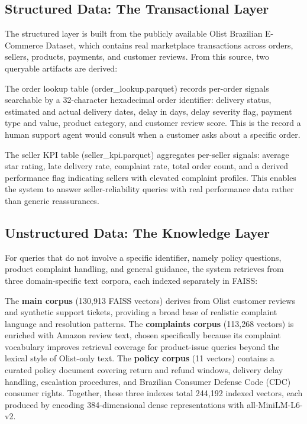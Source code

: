 \documentclass[conference]{IEEEtran}
\begin{document}
\subsection{Structured Data: The Transactional Layer}
The structured layer is built from the publicly available Olist Brazilian
E-Commerce Dataset, which contains real marketplace transactions across orders,
sellers, products, payments, and customer reviews. From this source, two queryable
artifacts are derived:

The order lookup table (order\_lookup.parquet) records per-order signals searchable
by a 32-character hexadecimal order identifier: delivery status, estimated and
actual delivery dates, delay in days, delay severity flag, payment type and value,
product category, and customer review score. This is the record a human support
agent would consult when a customer asks about a specific order.

The seller KPI table (seller\_kpi.parquet) aggregates per-seller signals: average
star rating, late delivery rate, complaint rate, total order count, and a derived
performance flag indicating sellers with elevated complaint profiles.
This enables the system to answer seller-reliability queries with real performance
data rather than generic reassurances.

\subsection{Unstructured Data: The Knowledge Layer}
For queries that do not involve a specific identifier, namely policy questions,
product complaint handling, and general guidance, the system retrieves from three
domain-specific text corpora, each indexed separately in FAISS:

The \textbf{main corpus} (130,913 FAISS vectors) derives from Olist customer
reviews and synthetic support tickets, providing a broad base of realistic
complaint language and resolution patterns. The \textbf{complaints corpus}
(113,268 vectors) is enriched with Amazon review text, chosen specifically because
its complaint vocabulary improves retrieval coverage for product-issue queries
beyond the lexical style of Olist-only text. The \textbf{policy corpus} (11 vectors)
contains a curated policy document covering return and refund windows, delivery
delay handling, escalation procedures, and Brazilian Consumer Defense Code (CDC)
consumer rights. Together, these three indexes total 244,192 indexed vectors, each
produced by encoding 384-dimensional dense representations with all-MiniLM-L6-v2.
\end{document}
